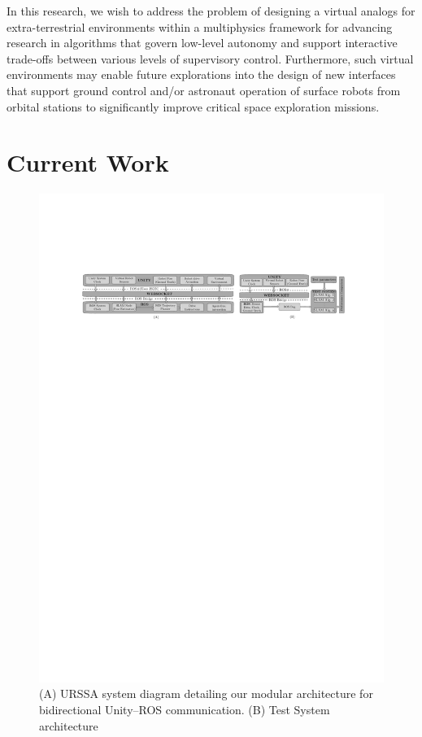 \documentclass[a4paper, 10pt, conference]{ieeeconf}      %
\begin{document}
In this research, we wish to address the problem of designing a virtual analogs for extra-terrestrial environments within a multiphysics framework for advancing research in algorithms that govern low-level autonomy and support interactive trade-offs between various levels of supervisory control. Furthermore, such virtual environments may enable future explorations into the design of new interfaces that support ground control and/or astronaut operation of surface robots from orbital stations to significantly improve critical space exploration missions. 
\section{Current Work}
\begin{figure}[t]
      \centering
        \includegraphics[width=1.0\textwidth]{Figures/sysarch_test_diag.pdf}
      \caption{(A) URSSA system diagram detailing our modular architecture for bidirectional Unity--ROS communication. (B) Test System architecture}
      \vspace{-1em}
      \label{flowchart}
\end{figure}
\end{document}
